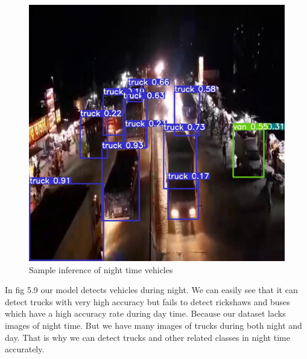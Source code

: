 \begin{figure}[h]
    \centering
    \includegraphics[max width=\textwidth]{images/ours/3 (1).jpg}
   \caption{ Sample inference of night time vehicles}
    \label{fig:inference34567}
\end{figure}

In fig 5.9 our model detects vehicles during night. We can easily see that it can detect trucks with very high accuracy but fails to detect rickshaws and buses which have a high accuracy rate during day time. Because our dataset lacks images of night time. But we have many images of trucks during both night and day. That is why we can detect trucks and other related classes in night time accurately.

\newpage

